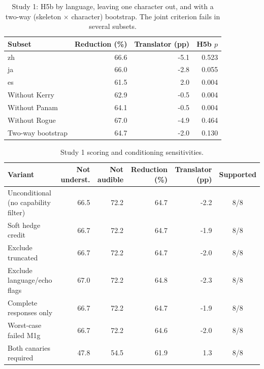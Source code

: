 \documentclass[11pt]{article}
\begin{document}
\begin{table}[t]
\centering\footnotesize\setlength{\tabcolsep}{3.5pt}
\begin{tabular}{@{}lrrr@{}}
\toprule
Subset & Reduction (\%) & Translator (pp) & H5b $p$\\
\midrule
zh & 66.6 & -5.1 & 0.523\\
ja & 66.0 & -2.8 & 0.055\\
es & 61.5 & 2.0 & 0.004\\
Without Kerry & 62.9 & -0.5 & 0.004\\
Without Panam & 64.1 & -0.5 & 0.004\\
Without Rogue & 67.0 & -4.9 & 0.464\\
Two-way bootstrap & 64.7 & -2.0 & 0.130\\
\bottomrule
\end{tabular}
\caption{Study 1: H5b by language, leaving one character out, and with a two-way (skeleton $\times$ character) bootstrap. The joint criterion fails in several subsets.}
\label{tab:s1sub}
\end{table}
\begin{table}[t]
\centering\small
\begin{tabular}{@{}lrrrrc@{}}
\toprule
Variant & Not underst. & Not audible & Reduction (\%) & Translator (pp) & Supported\\
\midrule
Unconditional (no capability filter) & 66.5 & 72.2 & 64.7 & -2.2 & 8/8\\
Soft hedge credit & 66.7 & 72.2 & 64.7 & -1.9 & 8/8\\
Exclude truncated & 66.7 & 72.2 & 64.7 & -2.0 & 8/8\\
Exclude language/echo flags & 67.0 & 72.2 & 64.8 & -2.3 & 8/8\\
Complete responses only & 66.7 & 72.2 & 64.7 & -1.9 & 8/8\\
Worst-case failed M1g & 66.7 & 72.2 & 64.6 & -2.0 & 8/8\\
Both canaries required & 47.8 & 54.5 & 61.9 & 1.3 & 8/8\\
\bottomrule
\end{tabular}
\caption{Study 1 scoring and conditioning sensitivities.}
\label{tab:s1sens}
\end{table}
\end{document}
